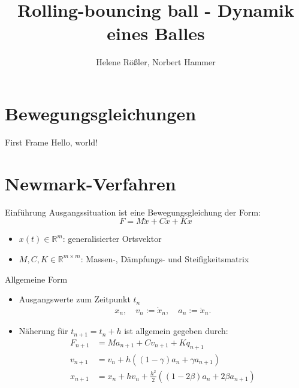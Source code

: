 \documentclass{beamer}
\title{Rolling-bouncing ball - Dynamik eines Balles}
\author{Helene Rößler, Norbert Hammer}
\date{}
\begin{document}
\maketitle

\section{Bewegungsgleichungen}

\begin{frame}{First Frame}
Hello, world!
\end{frame}

\section{Newmark-Verfahren}

\begin{frame}{Einführung}
Ausgangssituation ist eine Bewegungsgleichung der Form:
\begin{equation*}
	F = M \ddot{x} + C \dot{x} + Kx
\end{equation*}

\begin{itemize}
	\item $x(t) \in \mathbb{R}^{m}$: generalisierter Ortsvektor
	\item $M, C, K \in \mathbb{R}^{m \times m}$: Massen-, Dämpfungs- und Steifigkeitsmatrix
\end{itemize}

\end{frame}


\begin{frame}{Allgemeine Form}
	
\begin{itemize}
\item Ausgangswerte zum Zeitpunkt $t_n$
\begin{align*}
	x_n, \quad v_n := \dot{x}_n, \quad a_n := \ddot{x}_n.
\end{align*}
\item Näherung für $t_{n+1} = t_n + h$ ist allgemein gegeben durch:
\begin{align*}
	F_{n+1} &= M a_{n+1} + C v_{n+1} + K q_{n+1}\\
	v_{n+1} &= v_{n} + h\left({\left(1 - \gamma\right) a_{n} + \gamma{a_{n+1}}}\right)\\
	x_{n+1} &= x_{n} + h v_{n} + \frac{h^2}{2} \left({\left(1 - 2\beta\right) a_{n} + 2\beta a_{n+1}}\right)
\end{align*}
\end{itemize}

\end{frame}
\end{document}
